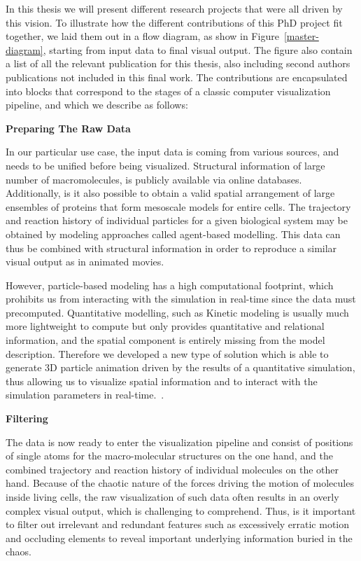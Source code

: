 In this thesis we will present different research projects that were all driven by this vision.
To illustrate how the different contributions of this PhD project fit together, we laid them out in a flow diagram, as show in Figure~\ref{master-diagram}, starting from input data to final visual output.
The figure also contain a list of all the relevant publication for this thesis, also including second authors publications not included in this final work.
The contributions are encapsulated into blocks that correspond to the stages of a classic computer visualization pipeline, and which we describe as follows:


\textbf{Preparing The Raw Data}

In our particular use case, the input data is coming from various sources, and needs to be unified before being visualized.
Structural information of large number of macromolecules, is publicly available via online databases.
Additionally, is it also possible to obtain a valid spatial arrangement of large ensembles of proteins that form mesoscale models for entire cells.
The trajectory and reaction history of individual particles for a given biological system may be obtained by modeling approaches called agent-based modelling.
This data can thus be combined with structural information in order to reproduce a similar visual output as in animated movies.

However, particle-based modeling has a high computational footprint, which prohibits us from interacting with the simulation in real-time since the data must precomputed.
Quantitative modelling, such as Kinetic modeling is usually much more lightweight to compute but only provides quantitative and relational information, and the spatial component is entirely missing from the model description.
Therefore we developed a new type of solution which is able to generate 3D particle animation driven by the results of a quantitative simulation, thus allowing us to visualize spatial information and to interact with the simulation parameters in real-time.~\cite{le2014illustrative}.

\textbf{Filtering}

The data is now ready to enter the visualization pipeline and consist of positions of single atoms for the macro-molecular structures on the one hand, and the combined trajectory and reaction history of individual molecules on the other hand.
Because of the chaotic nature of the forces driving the motion of molecules inside living cells, the raw visualization of such data often results in an overly complex visual output, which is challenging to comprehend.
Thus, is it important to filter out irrelevant and redundant features such as excessively erratic motion and occluding elements to reveal important underlying information buried in the chaos.


